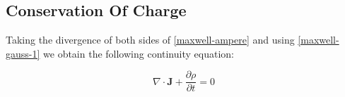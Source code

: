 % 
% 
% 
% 
% 
% 
% 
% 
 
 

\subsection{Conservation Of Charge}

Taking the divergence of both sides of \eqref{maxwell-ampere} and using \eqref{maxwell-gauss-1} we obtain the following continuity equation:

\begin{equation}
\nabla \cdot \mathbf{J} + \frac{\partial \rho }{\partial t} = 0
\label{conservation-of-charge}
\end{equation}

